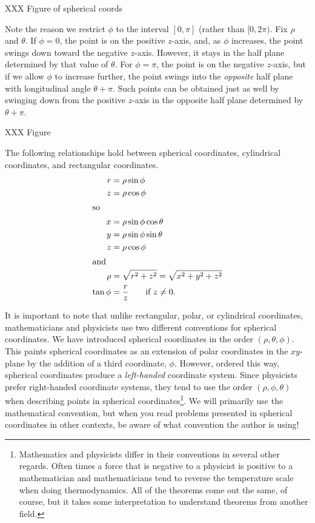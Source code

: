 XXX Figure of spherical coords

Note the reason we restrict $\phi$ to the interval $[0,\pi]$ (rather than
$[0,2\pi)$. Fix $\rho$
and $\theta$.   If $\phi = 0$,
the point is on the positive $z$-axis, and, as $\phi$ increases,
the point swings down toward the negative $z$-axis. However, it stays
in the half plane determined by that value of $\theta$.  For
$\phi = \pi$, the point is on the negative $z$-axis, but if we
allow $\phi$ to increase further, the point swings into the
\emph{opposite} half plane with longitudinal angle $\theta + \pi$.
Such points can be obtained just as well by swinging down from
the positive $z$-axis in the opposite half plane determined by
$\theta + \pi$.

XXX Figure

The following relationships hold between spherical coordinates,
cylindrical coordinates, and rectangular coordinates. 
\begin{align*}
	r & = \rho \sin\phi \\
	z & = \rho \cos\phi \\
	\intertext{so}
	x &=  \rho \sin\phi \cos\theta \\
	y &=  \rho \sin\phi \sin\theta \\
	z & = \rho \cos\phi\\
	\intertext{and}
	\rho &= \sqrt{r^2 + z^2} = \sqrt{x^2 + y^2 + z^2} \\
	\tan\phi &= \frac rz\qquad\text{if } z \ne 0.
\end{align*}

It is important to note that unlike rectangular, polar, or cylindrical coordinates,
mathematicians and physicists use two different conventions for spherical coordinates.
We have introduced spherical coordinates in the order $(\rho,\theta,\phi)$.  This
paints spherical coordinates as an extension of polar coordinates in the $xy$-plane by
the addition of a third coordinate, $\phi$.  However, ordered this way, spherical
coordinates produce a \emph{left-handed} coordinate system.  Since physicists prefer
right-handed coordinate systems, they tend to use the order $(\rho,\phi,\theta)$ when
describing points in spherical coordinates\footnote{ Mathematics and physicists
differ in their conventions in several other regards.  Often times a force that is negative
to a physicist is positive to a mathematician and mathematicians tend to reverse the temperature
scale when doing thermodynamics.  All of the theorems come out the same, of course,
but it takes some interpretation to understand theorems from another field.}.  
We will primarily use the mathematical convention,
but when you read problems presented in spherical coordinates in other contexts, be
aware of what convention the author is using!


